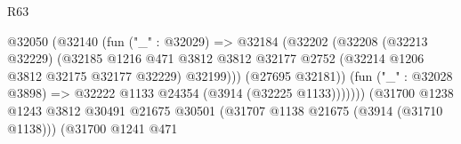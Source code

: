 \begin{lexlean}{R63}
\begin{coremodule}
                                                      @32050
                                                        (@32140
                                                          (fun ("_" : @32029) =>
                                                          @32184
                                                            (@32202
                                                              (@32208
                                                                (@32213 @32229)
                                                                (@32185
                                                                  @1216
                                                                  @471
                                                                  @3812
                                                                  @3812
                                                                  @32177
                                                                  @2752
                                                                  (@32214
                                                                    @1206
                                                                    @3812
                                                                    @32175
                                                                    @32177
                                                                    @32229)
                                                                  @32199)))
                                                            (@27695 @32181))
                                                          (fun ("_" : @32028 @3898) =>
                                                          @32222
                                                            @1133
                                                            @24354
                                                            (@3914 (@32225 @1133)))))))
                                                  (@31700
                                                    @1238
                                                    @1243
                                                    @3812
                                                    @30491
                                                    @21675
                                                    @30501
                                                    (@31707 @1138 @21675 (@3914 (@31710 @1138)))
                                                    (@31700
                                                      @1241
                                                      @471

\end{coremodule}
\end{lexlean}
